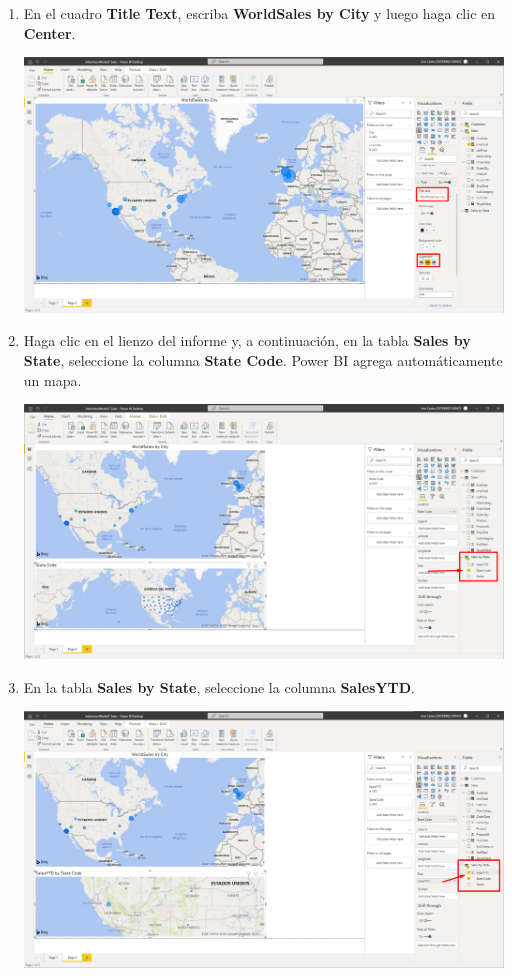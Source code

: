 \documentclass[12pt,letterpaper]{article}
\newcommand\tab[1][1cm]{\hspace*{#1}}
\begin{document}
\begin{enumerate}[\tab 1.]
\begin{center}
        \end{center}
        \item En el cuadro \textbf{Title Text}, escriba \textbf{WorldSales by City} y luego haga clic en \textbf{Center}.
        \begin{center}
            \includegraphics[width=13cm]{./img/img125.png}
        \end{center}
        \item Haga clic en el lienzo del informe y, a continuación, en la tabla \textbf{Sales by State}, seleccione la columna \textbf{State Code}. Power BI agrega automáticamente un mapa.
        \begin{center}
            \includegraphics[width=13cm]{./img/img126.png}
        \end{center}
        \item En la tabla \textbf{Sales by State}, seleccione la columna \textbf{SalesYTD}.
        \begin{center}
            \includegraphics[width=13cm]{./img/img127.png}

\end{center}
\end{enumerate}
\end{document}
